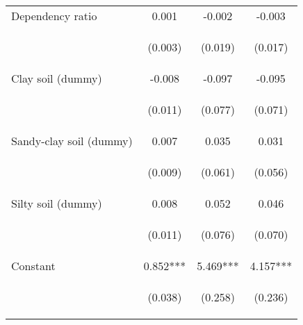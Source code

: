\begin{center}
\begin{tabular}{lccc}
Dependency ratio & 0.001 & -0.002 & -0.003 \\
\vspace{4pt} & \begin{footnotesize}(0.003)\end{footnotesize} & \begin{footnotesize}(0.019)\end{footnotesize} & \begin{footnotesize}(0.017)\end{footnotesize} \\
Clay soil (dummy) & -0.008 & -0.097 & -0.095 \\
\vspace{4pt} & \begin{footnotesize}(0.011)\end{footnotesize} & \begin{footnotesize}(0.077)\end{footnotesize} & \begin{footnotesize}(0.071)\end{footnotesize} \\
Sandy-clay soil (dummy) & 0.007 & 0.035 & 0.031 \\
\vspace{4pt} & \begin{footnotesize}(0.009)\end{footnotesize} & \begin{footnotesize}(0.061)\end{footnotesize} & \begin{footnotesize}(0.056)\end{footnotesize} \\
Silty soil (dummy) & 0.008 & 0.052 & 0.046 \\
\vspace{4pt} & \begin{footnotesize}(0.011)\end{footnotesize} & \begin{footnotesize}(0.076)\end{footnotesize} & \begin{footnotesize}(0.070)\end{footnotesize} \\
Constant & 0.852*** & 5.469*** & 4.157*** \\
 & \begin{footnotesize}(0.038)\end{footnotesize} & \begin{footnotesize}(0.258)\end{footnotesize} & \begin{footnotesize}(0.236)\end{footnotesize} \\

\end{tabular}
\end{center}
